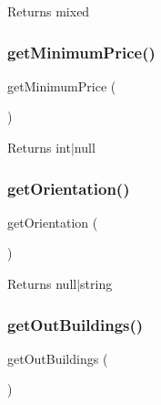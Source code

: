 \begin{DoxyReturn}{Returns}
mixed 
\end{DoxyReturn}
\mbox{\label{class_app_1_1_entity_1_1_possession_a25d2aecd8053b66c953a617b41fe3739}} 
\subsubsection{\texorpdfstring{getMinimumPrice()}{getMinimumPrice()}}
{\footnotesize\ttfamily get\+Minimum\+Price (\begin{DoxyParamCaption}{ }\end{DoxyParamCaption})}

\begin{DoxyReturn}{Returns}
int$\vert$null 
\end{DoxyReturn}
\mbox{\label{class_app_1_1_entity_1_1_possession_a173749a621180fd9278040151c453038}} 
\subsubsection{\texorpdfstring{getOrientation()}{getOrientation()}}
{\footnotesize\ttfamily get\+Orientation (\begin{DoxyParamCaption}{ }\end{DoxyParamCaption})}

\begin{DoxyReturn}{Returns}
null$\vert$string 
\end{DoxyReturn}
\mbox{\label{class_app_1_1_entity_1_1_possession_abf441a42ccc864bf8016020c8e54cb43}} 
\subsubsection{\texorpdfstring{getOutBuildings()}{getOutBuildings()}}
{\footnotesize\ttfamily get\+Out\+Buildings (\begin{DoxyParamCaption}{ }\end{DoxyParamCaption})}

